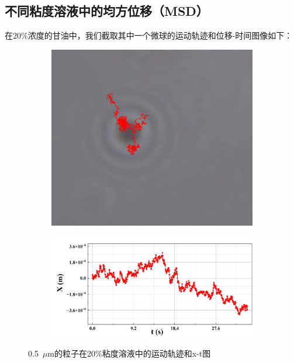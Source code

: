 \documentclass[a4paper]{report} %
\begin{document}
\subsection{不同粘度溶液中的均方位移（MSD）}
在20\%浓度的甘油中，我们截取其中一个微球的运动轨迹和位移-时间图像如下：\par
\begin{figure}[H]
    \centering
    \begin{subfigure}{0.3\textwidth}
        \includegraphics[width=\linewidth]{image7.png}
    \end{subfigure}
    \begin{subfigure}{0.6\textwidth}
        \includegraphics[width=\linewidth]{image8.png}
    \end{subfigure}

    \caption{0.5~$\mu$m的粒子在20\%粘度溶液中的运动轨迹和x-t图}
\end{figure}
\end{document}
